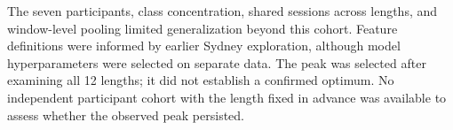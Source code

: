 \documentclass[11pt,a4paper]{article}
\begin{document}
The seven participants, class concentration, shared sessions across lengths,
and window-level pooling limited generalization beyond this cohort. Feature
definitions were informed by earlier Sydney exploration, although model
hyperparameters were selected on separate data. The peak was selected after
examining all 12 lengths; it did not establish a confirmed optimum. No
independent participant cohort with the length fixed in advance was available
to assess whether the observed peak persisted.
\end{document}
